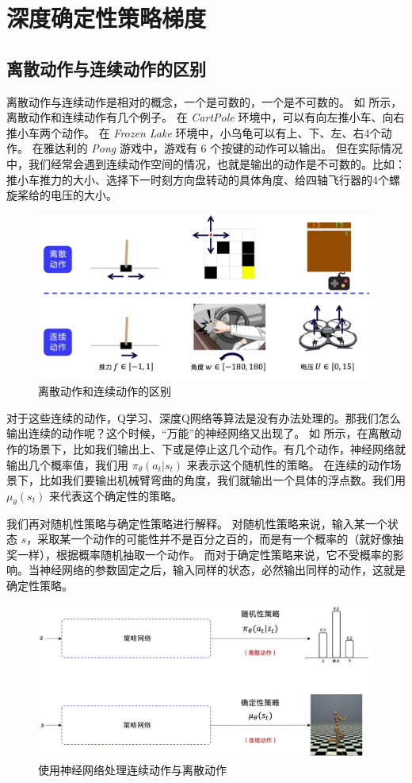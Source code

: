 \section{深度确定性策略梯度} 

\subsection{离散动作与连续动作的区别} 

离散动作与连续动作是相对的概念，一个是可数的，一个是不可数的。 
如 所示，离散动作和连续动作有几个例子。
在 \textit{CartPole} 环境中，可以有向左推小车、向右推小车两个动作。
在 \textit{Frozen Lake} 环境中，小乌龟可以有上、下、左、右4个动作。
在雅达利的 \textit{Pong} 游戏中，游戏有 6 个按键的动作可以输出。 
但在实际情况中，我们经常会遇到连续动作空间的情况，也就是输出的动作是不可数的。比如：推小车推力的大小、选择下一时刻方向盘转动的具体角度、给四轴飞行器的4个螺旋桨给的电压的大小。

\begin{figure}[hbt]
  \centering
  \includegraphics[width=0.7\linewidth]{res/ch12/12.1}
  \caption{离散动作和连续动作的区别}
  \label{fig:fig12.1}
\end{figure}

对于这些连续的动作，Q学习、深度Q网络等算法是没有办法处理的。那我们怎么输出连续的动作呢？这个时候，“万能”的神经网络又出现了。
如 所示，在离散动作的场景下，比如我们输出上、下或是停止这几个动作。有几个动作，神经网络就输出几个概率值，我们用 $\pi_\theta(a_t|s_t)$ 来表示这个随机性的策略。
在连续的动作场景下，比如我们要输出机械臂弯曲的角度，我们就输出一个具体的浮点数。我们用 $\mu_{\theta}(s_t)$ 来代表这个确定性的策略。

我们再对随机性策略与确定性策略进行解释。
对随机性策略来说，输入某一个状态 $s$，采取某一个动作的可能性并不是百分之百的，而是有一个概率的（就好像抽奖一样），根据概率随机抽取一个动作。
而对于确定性策略来说，它不受概率的影响。当神经网络的参数固定之后，输入同样的状态，必然输出同样的动作，这就是确定性策略。
\begin{figure}[htb]
  \centering
  \includegraphics[width=0.7\linewidth]{res/ch12/12.2}
  \caption{使用神经网络处理连续动作与离散动作}
  \label{fig:fig12.2}
\end{figure}

